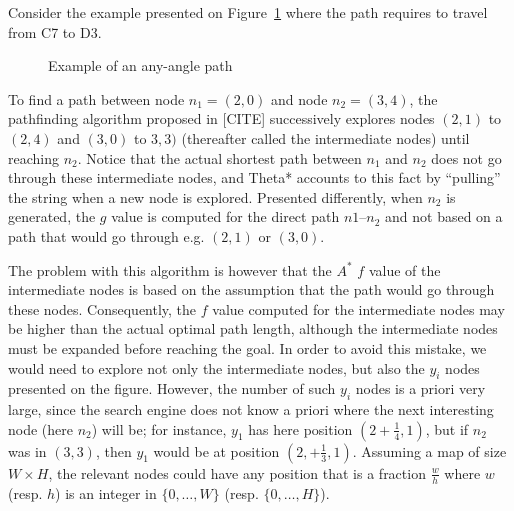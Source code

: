 Consider the example presented on Figure~\ref{fig::ex1} 
where the path requires to travel from C7 to D3.


\begin{figure}[ht]
  \begin{center}
    
  \end{center}
  \caption{Example of an any-angle path}
  \label{fig::ex1}
\end{figure}

To find a path between node $n_1 = (2,0)$ and node $n_2 = (3,4)$, 
the pathfinding algorithm proposed in [CITE] 
successively explores nodes $(2,1)$ to $(2,4)$ and $(3,0)$ to $3,3)$ 
(thereafter called the intermediate nodes) until reaching $n_2$.  
Notice that the actual shortest path between $n_1$ and $n_2$ 
does not go through these intermediate nodes, 
and Theta* accounts to this fact by ``pulling'' the string 
when a new node is explored.  
Presented differently, when $n_2$ is generated, 
the $g$ value is computed for the direct path $n1$--$n_2$ 
and not based on a path that would go through e.g. $(2,1)$ or $(3,0)$.  

The problem with this algorithm 
is however that the $A^*$ $f$ value of the intermediate nodes 
is based on the assumption that the path would go through these nodes.  
Consequently, the $f$ value computed 
for the intermediate nodes may be higher 
than the actual optimal path length, 
although the intermediate nodes must be expanded 
before reaching the goal.  
In order to avoid this mistake, 
we would need to explore not only the intermediate nodes, 
but also the $y_i$ nodes presented on the figure.  
However, the number of such $y_i$ nodes is a priori very large, 
since the search engine does not know a priori 
where the next interesting node (here $n_2$) will be; 
for instance, $y_1$ has here position $(2 + \frac{1}{4},1)$, 
but if $n_2$ was in $(3,3)$, 
then $y_1$ would be at position $(2, + \frac{1}{3},1)$.  
Assuming a map of size $W\times H$, 
the relevant nodes could have any position 
that is a fraction $\frac{w}{h}$ 
where $w$ (resp. $h$) is an integer 
in $\{0,\dots,W\}$ (resp. $\{0,\dots,H\}$).  

